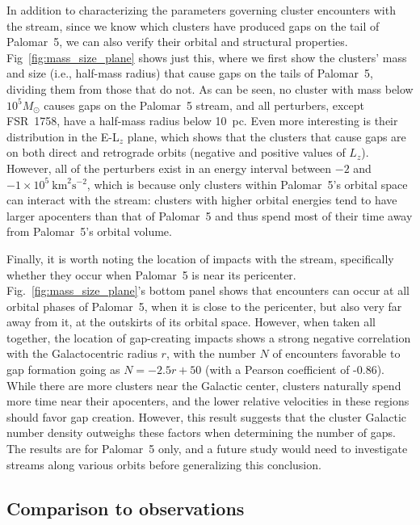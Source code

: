 \documentclass{aa}
\begin{document}
    In addition to characterizing the parameters governing cluster encounters with the stream, since we know which clusters have produced gaps on the tail of Palomar~5, we can also verify their orbital and structural properties. Fig~\ref{fig:mass_size_plane} shows just this, where we first show the clusters' mass and size (i.e., half-mass radius) that cause gaps on the tails of Palomar~5, dividing them from those that do not. As can be seen, no cluster with mass below $10^5 M_\odot$ causes gaps on the Palomar~5 stream, and all perturbers, except FSR~1758, have a half-mass radius below 10~pc. Even more interesting is their distribution in the E-L$_z$ plane, which shows that the clusters that cause gaps are on both direct and retrograde orbits (negative and positive values of $L_z$). However, all of the perturbers exist in an energy interval between $-2$ and $-1 \times10^5~\textrm{km}^2\textrm{s}^{-2}$, which is because only clusters within Palomar~5's orbital space can interact with the stream: clusters with higher orbital energies tend to have larger apocenters than that of Palomar~5 and thus spend most of their time away from Palomar~5's orbital volume. 
    
    Finally, it is worth noting the location of impacts with the stream, specifically whether they occur when Palomar~5 is near its pericenter. Fig.~\ref{fig:mass_size_plane}'s bottom panel shows that encounters can occur at all orbital phases of Palomar~5, when it is close to the pericenter, but also very far away from it, at the outskirts of its orbital space. However, when taken all together, the location of gap-creating impacts shows a strong negative correlation with the Galactocentric radius $r$, with the number $N$ of encounters favorable to gap formation going as $N = -2.5r + 50$ (with a Pearson coefficient of -0.86). While there are more clusters near the Galactic center, clusters naturally spend more time near their apocenters, and the lower relative velocities in these regions should favor gap creation. However, this result suggests that the cluster Galactic number density outweighs these factors when determining the number of gaps. The results are for Palomar~5 only, and a future study would need to investigate streams along various orbits before generalizing this conclusion.
    



  \subsection{Comparison to observations}
\end{document}

